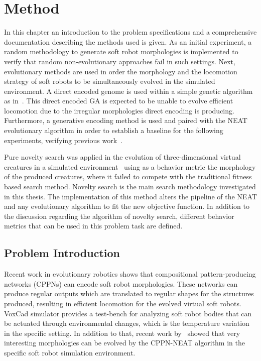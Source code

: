 
\chapter{Method} %

\label{Method} %



In this chapter an introduction to the problem specifications and a comprehensive documentation describing the methods used is given. As an initial experiment, a random methodology to generate soft robot morphologies is implemented to verify that random non-evolutionary approaches fail in such settings. Next, evolutionary methods are used in order the morphology and the locomotion strategy of soft robots to be simultaneously evolved in the simulated environment. A direct encoded genome is used within a simple genetic algorithm as in~\citep{cheney2013unshackling}. This direct encoded GA is expected to be unable to evolve efficient locomotion due to the irregular morphologies direct encoding is producing. Furthermore, a generative encoding method is used and paired with the NEAT evolutionary algorithm in order to establish a baseline for the following experiments, verifying previous work~\citep{cheney2013unshackling}.

Pure novelty search was applied in the evolution of three-dimensional virtual creatures in a simulated environment~\citep{lehman2011evolving} using as a behavior metric the morphology of the produced creatures, where it failed to compete with the traditional fitness based search method. Novelty search is the main search methodology investigated in this thesis. The implementation of this method alters the pipeline of the NEAT and any evolutionary algorithm to fit the new objective function. In addition to the discussion regarding the algorithm of novelty search, different behavior metrics that can be used in this problem task are defined.



\section{Problem Introduction}
Recent work in evolutionary robotics shows that compositional pattern-producing networks (CPPNs) can encode soft robot morphologies. These networks can produce regular outputs which are translated to regular shapes for the structures produced, resulting in efficient locomotion for the evolved virtual soft robots. VoxCad simulator provides a test-bench for analyzing soft robot bodies that can be actuated through environmental changes, which is the temperature variation in the specific setting. In addition to that, recent work by~\citep{cheney2013unshackling} showed that very interesting morphologies can be evolved by the CPPN-NEAT algorithm in the specific soft robot simulation environment.

